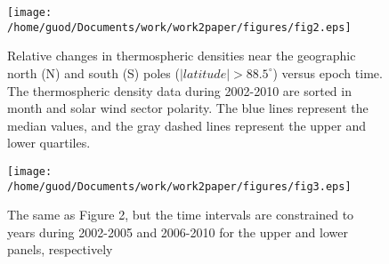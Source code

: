 \documentclass[draft, grl]{/home/guod/Documents/template/agu_template/AGUTeX}
\begin{document}
\begin{figure}
    \centering
    \noindent\texttt{[image: 
    /home/guod/Documents/work/work2paper/figures/fig2.eps]}
    \caption{Relative changes in thermospheric densities near the geographic 
        north (N) and south (S) poles ($\left|latitude\right| > 88.5^\circ$)
        versus epoch time. The thermospheric density data during 2002-2010 are
        sorted in month and solar wind sector polarity. The blue lines 
        represent the median values, and the gray dashed lines represent the
        upper and lower quartiles.}
    \label{figure2}
\end{figure}
\begin{figure}
    \centering
    \noindent\texttt{[image: 
    /home/guod/Documents/work/work2paper/figures/fig3.eps]}
    \caption{The same as Figure 2, but the time intervals are constrained to
        years during 2002-2005 and 2006-2010 for the upper and lower panels,
        respectively}
    \label{figure3}
\end{figure}
\end{document}
